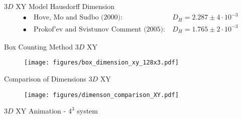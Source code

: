 \documentclass[10pt]{beamer}
\begin{document}
\begin{frame}{$3D$ XY Model Hausdorff Dimension}
    \begin{align*}
        \bullet \ &\text{Hove, Mo and Sudbo (2000):}\ &D_H = 2.287 \pm 4 \cdot 10^{-3} \\
        \bullet \ &\text{Prokof'ev and Svistunov Comment (2005):} \ &D_H = 1.765 \pm 2 \cdot 10^{-3}
    \end{align*}
\end{frame}

\begin{frame}{Box Counting Method $3D$ XY}
    \begin{figure}[h!]
        \centering
            \texttt{[image: figures/box\_dimension\_xy\_128x3.pdf]}
    \end{figure}
\end{frame}

\begin{frame}{Comparison of Dimensions $3D$ XY}
    \begin{figure}[h!]
        \centering
            \texttt{[image: figures/dimenson\_comparison\_XY.pdf]}
    \end{figure}
\end{frame}


\begin{frame}{$3D$ XY Animation - $4^3$ system}
\end{frame}
\end{document}
